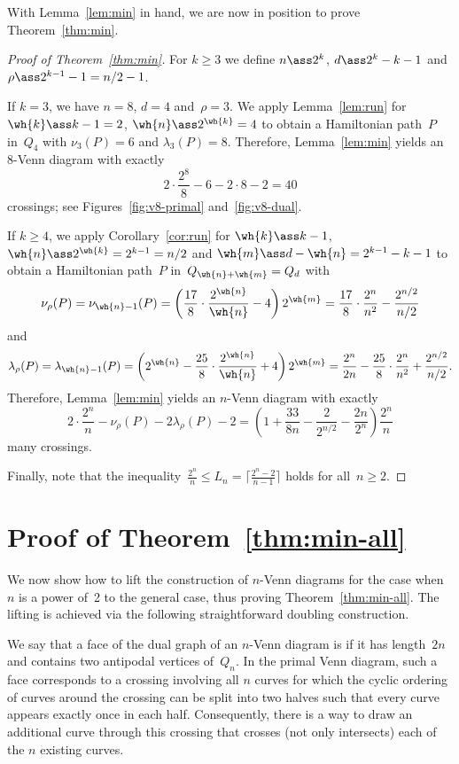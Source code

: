 \documentclass[a4paper,11pt,reqno]{amsart}
\begin{document}
With Lemma~\ref{lem:min} in hand, we are now in position to prove Theorem~\ref{thm:min}.

\begin{proof}[Proof of Theorem~\ref{thm:min}]
For $k\ge 3$ we define $n\ass 2^k$, $d\ass 2^k-k-1$ and $\rho\ass 2^{k-1}-1=n/2-1$.

If $k=3$, we have $n=8$, $d=4$ and~$\rho=3$.
We apply Lemma~\ref{lem:run} for $\wh{k}\ass k-1=2$, $\wh{n}\ass 2^{\wh{k}}=4$ to obtain a Hamiltonian path~$P$ in~$Q_4$ with $\nu_3(P)=6$ and $\lambda_3(P)=8$.
Therefore, Lemma~\ref{lem:min} yields an $8$-Venn diagram with exactly
\[ 2\cdot\frac{2^8}{8}-6-2\cdot 8-2=40 \]
crossings; see Figures~\ref{fig:v8-primal} and~\ref{fig:v8-dual}.

If $k\ge 4$, we apply Corollary~\ref{cor:run} for $\wh{k}\ass k-1$, $\wh{n}\ass 2^{\wh{k}}=2^{k-1}=n/2$ and $\wh{m}\ass d-\wh{n}=2^{k-1}-k-1$ to obtain a Hamiltonian path~$P$ in~$Q_{\wh{n}+\wh{m}}=Q_d$ with
\[ \nu_\rho(P)=\nu_{\wh{n}-1}(P)=\left(\frac{17}{8}\cdot\frac{2^{\wh{n}}}{\wh{n}}-4\right)2^{\wh{m}}=\frac{17}{8}\cdot\frac{2^n}{n^2}-\frac{2^{n/2}}{n/2} \]
and
\[ \lambda_\rho(P)=\lambda_{\wh{n}-1}(P)=\left(2^{\wh{n}}-\frac{25}{8}\cdot \frac{2^{\wh{n}}}{\wh{n}}+4\right)2^{\wh{m}}=\frac{2^n}{2n}-\frac{25}{8}\cdot\frac{2^n}{n^2}+\frac{2^{n/2}}{n/2}. \]
Therefore, Lemma~\ref{lem:min} yields an $n$-Venn diagram with exactly
\[ 2\cdot\frac{2^n}{n}-\nu_\rho(P)-2\lambda_\rho(P)-2=\left(1+\frac{33}{8n}-\frac{2}{2^{n/2}}-\frac{2n}{2^n}\right)\frac{2^n}{n} \]
many crossings.

Finally, note that the inequality~$\frac{2^n}{n}\le L_n=\lceil\frac{2^n-2}{n-1}\rceil$ holds for all~$n\ge 2$.
\end{proof}


\section{Proof of Theorem~\ref{thm:min-all}}

We now show how to lift the construction of $n$-Venn diagrams for the case when $n$ is a power of~2 to the general case, thus proving Theorem~\ref{thm:min-all}.
The lifting is achieved via the following straightforward doubling construction.

We say that a face of the dual graph of an $n$-Venn diagram is  if it has length~$2n$ and contains two antipodal vertices of~$Q_n$.
In the primal Venn diagram, such a face corresponds to a crossing involving all $n$ curves for which the cyclic ordering of curves around the crossing can be split into two halves such that every curve appears exactly once in each half.
Consequently, there is a way to draw an additional curve through this crossing that crosses (not only intersects) each of the $n$ existing curves.
\end{document}
